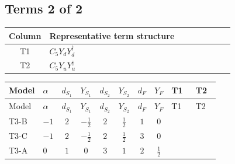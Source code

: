 \documentclass[8pt]{article}
\begin{document}
\begin{landscape}
\subsection*{Terms 2 of 2}
\begin{center}
\begin{tabular}{@{}c >{\raggedright\arraybackslash}p{0.82\linewidth}@{}}
\toprule
Column & Representative term structure \\
\midrule
T1 & \(\displaystyle C_{5} Y_d Y_d^\dagger\) \\
\midrule
T2 & \(\displaystyle C_{5} Y_u Y_u^\dagger\) \\
\midrule
\bottomrule
\end{tabular}
\end{center}
\smallskip
\tiny
\begin{longtable}{@{}llcccccc >{\raggedright\arraybackslash}p{0.21\linewidth} >{\raggedright\arraybackslash}p{0.21\linewidth}@{}}
\toprule
Model & $\alpha$ & $d_{S_1}$ & $Y_{S_1}$ & $d_{S_2}$ & $Y_{S_2}$ & $d_F$ & $Y_F$ & T1 & T2 \\
\midrule
\endfirsthead
\toprule
Model & $\alpha$ & $d_{S_1}$ & $Y_{S_1}$ & $d_{S_2}$ & $Y_{S_2}$ & $d_F$ & $Y_F$ & T1 & T2 \\
\midrule
\endhead
T3-B & $-1$ & $2$ & $-\frac{1}{2}$ & $2$ & $\frac{1}{2}$ & $1$ & $0$ & \scriptsize\adjustbox{max width=\linewidth}{$\begin{gathered} 6 C_{5} Y_d Y_d^\dagger\end{gathered}$} & \scriptsize\adjustbox{max width=\linewidth}{$\begin{gathered} 6 C_{5} Y_u Y_u^\dagger\end{gathered}$} \\
\midrule
T3-C & $-1$ & $2$ & $-\frac{1}{2}$ & $2$ & $\frac{1}{2}$ & $3$ & $0$ & \scriptsize\adjustbox{max width=\linewidth}{$\begin{gathered} 6 C_{5} Y_d Y_d^\dagger\end{gathered}$} & \scriptsize\adjustbox{max width=\linewidth}{$\begin{gathered} 6 C_{5} Y_u Y_u^\dagger\end{gathered}$} \\
\midrule
T3-A & $0$ & $1$ & $0$ & $3$ & $1$ & $2$ & $\frac{1}{2}$ & \scriptsize\adjustbox{max width=\linewidth}{$\begin{gathered} 6 C_{5} Y_d Y_d^\dagger\end{gathered}$} & \scriptsize\adjustbox{max width=\linewidth}{$\begin{gathered} 6 C_{5} Y_u Y_u^\dagger\end{gathered}$} \\

\end{longtable}
\end{landscape}
\end{document}
